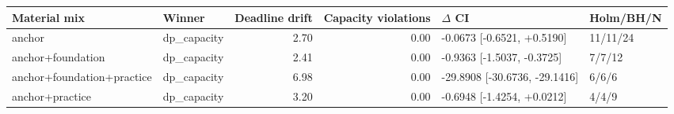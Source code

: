 \begin{tabular}{llrrll}
\toprule
Material mix & Winner & Deadline drift & Capacity violations & $\Delta$ CI & Holm/BH/N \\
\midrule
anchor & dp\_capacity & 2.70 & 0.00 & -0.0673 [-0.6521, +0.5190] & 11/11/24 \\
anchor+foundation & dp\_capacity & 2.41 & 0.00 & -0.9363 [-1.5037, -0.3725] & 7/7/12 \\
anchor+foundation+practice & dp\_capacity & 6.98 & 0.00 & -29.8908 [-30.6736, -29.1416] & 6/6/6 \\
anchor+practice & dp\_capacity & 3.20 & 0.00 & -0.6948 [-1.4254, +0.0212] & 4/4/9 \\
\bottomrule
\end{tabular}
